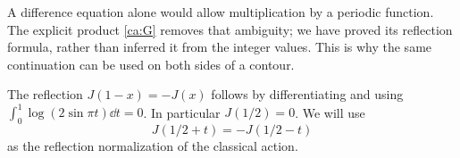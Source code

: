 A difference equation alone would allow multiplication by a periodic
function. The explicit product \eqref{ca:G} removes that ambiguity;
we have proved its reflection formula, rather than inferred it from the
integer values. This is why the same continuation can be used on both
sides of a contour.

The reflection $J(1-x)=-J(x)$ follows by differentiating and using
$\int_0^1\log(2\sin\pi t)\dd t=0$. In particular $J(1/2)=0$. We will use
\[
 J(1/2+t)=-J(1/2-t)
\]
as the reflection normalization of the classical action.

